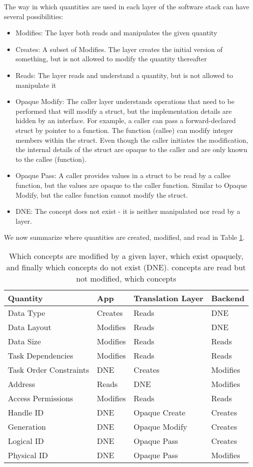 The way in which quantities are used in each layer of the software stack can have several possibilities:
\begin{itemize}
\item Modifies: The layer both reads and manipulates the given quantity
\item Creates: A subset of Modifies. The layer creates the initial version of something, but is not allowed to modify the quantity thereafter
\item Reads: The layer reads and understand a quantity, but is not allowed to manipulate it
\item Opaque Modify: The caller layer understands operations that need to be performed that will modify a struct, but the implementation details are hidden by an interface. 
For example, a caller can pass a forward-declared struct by pointer to a function. 
The function (callee) can modify integer members within the struct. 
Even though the caller initiates the modification, the internal details of the struct are opaque to the caller and are only known to the callee (function).
\item Opaque Pass: A caller provides values in a struct to be read by a callee function, but the values are opaque to the caller function. 
Similar to Opaque Modify, but the callee function cannot modify the struct.
\item DNE: The concept does not exist - it is neither manipulated nor read by a layer.
\end{itemize}
We now summarize where quantities are created, modified, and read in Table \ref{tbl:conceptsInLayers}.

\begin{table}
\begin{tabular}{l l l l}
\hline
Quantity & App & Translation Layer & Backend \\
\hline
Data Type & Creates & Reads & DNE \\
Data Layout & Modifies & Reads & DNE \\
Data Size & Modifies & Reads & Reads \\
Task Dependencies & Modifies & Reads & Reads \\
Task Order Constraints & DNE & Creates & Modifies \\
Address & Reads & DNE & Modifies \\
Access Permissions & Modifies & Reads & Reads \\
Handle ID & DNE & Opaque Create & Creates \\
Generation & DNE & Opaque Modify & Creates \\
Logical ID & DNE & Opaque Pass & Creates \\
Physical ID & DNE & Opaque Pass & Modifies 
\end{tabular}
\caption{Which concepts are modified by a given layer, which exist opaquely, and finally which concepts do not exist (DNE).
concepts are read but not modified, which concepts}
\label{tbl:conceptsInLayers}
\end{table}

